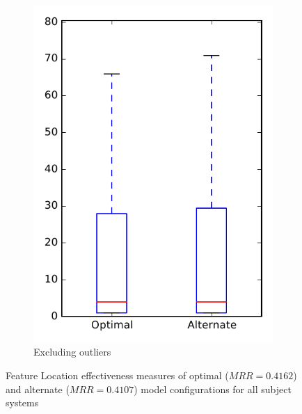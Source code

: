 \begin{figure}
\begin{subfigure}{.4\textwidth}
        \includegraphics[height=0.4\textheight]{figures/combo/flt_rq1_all_no_outlier}
        \caption{Excluding outliers}\label{fig:combo:flt:rq1:all_no_outlier}
    \end{subfigure}
\caption[Feature Location effectiveness measures of optimal and alternate model configurations for all subject systems]%
{Feature Location effectiveness measures of optimal ($MRR=0.4162$) and alternate ($MRR=0.4107$) model configurations for all subject systems}
\label{fig:combo:flt:rq1:all}
\end{figure}
